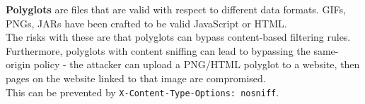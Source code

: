 \documentclass[11pt]{article}
\begin{document}
\textbf{Polyglots} are files that are valid with respect to different data formats.
GIFs, PNGs, JARs have been crafted to be valid JavaScript or HTML. \\

The risks with these are that polyglots can bypass content-based filtering rules.
Furthermore, polyglots with content sniffing can lead to bypassing the same-origin policy - the attacker can upload a PNG/HTML polyglot to a website, then pages on the website linked to that image are compromised. \\

This can be prevented by \texttt{X-Content-Type-Options: nosniff}.
\end{document}
